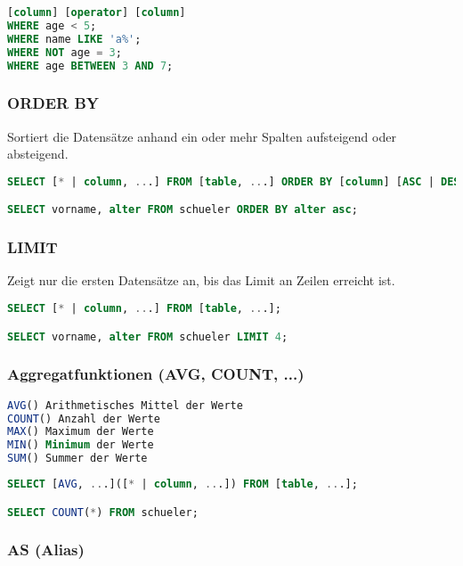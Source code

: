 \begin{lstlisting}[language=sql]
[column] [operator] [column]
WHERE age < 5;
WHERE name LIKE 'a%';
WHERE NOT age = 3;
WHERE age BETWEEN 3 AND 7;
\end{lstlisting}

\clearpage

\subsubsection{ORDER BY}

Sortiert die Datensätze anhand ein oder mehr Spalten aufsteigend oder absteigend.

\begin{lstlisting}[language=sql]
SELECT [* | column, ...] FROM [table, ...] ORDER BY [column] [ASC | DESC];

SELECT vorname, alter FROM schueler ORDER BY alter asc;
\end{lstlisting}

\subsubsection{LIMIT}

Zeigt nur die ersten Datensätze an, bis das Limit an Zeilen erreicht ist.

\begin{lstlisting}[language=sql]
SELECT [* | column, ...] FROM [table, ...];

SELECT vorname, alter FROM schueler LIMIT 4;
\end{lstlisting}

\subsubsection{Aggregatfunktionen (AVG, COUNT, ...)}

\begin{lstlisting}[language=sql]
AVG() Arithmetisches Mittel der Werte
COUNT() Anzahl der Werte
MAX() Maximum der Werte
MIN() Minimum der Werte
SUM() Summer der Werte
\end{lstlisting}

\begin{lstlisting}[language=sql]
SELECT [AVG, ...]([* | column, ...]) FROM [table, ...];

SELECT COUNT(*) FROM schueler;
\end{lstlisting}

\subsubsection{AS (Alias)}

